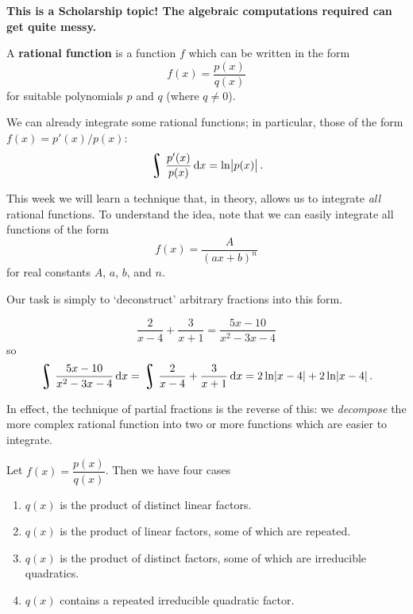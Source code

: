 


\textbf{\color{red} This is a Scholarship topic! The algebraic computations required can get quite messy.}

\begin{defn}
  A \textbf{rational function} is a function $ f $ which can be written in the form
  \begin{displaymath}
    f(x) = \dfrac{p(x)}{q(x)}
  \end{displaymath}
  for suitable polynomials $ p $ and $ q $ (where $ q \neq 0 $).
\end{defn}

We can already integrate some rational functions; in particular, those of the form $ f(x) = p'(x)/p(x) $:
\begin{displaymath}
  \rint \dfrac{p'(x)}{p(x)} \dif{x} = \ln\abs{p(x)}.
\end{displaymath}

This week we will learn a technique that, in theory, allows us to integrate \textit{all} rational functions. To understand
the idea, note that we can easily integrate all functions of the form
\begin{displaymath}
  f(x) = \dfrac{A}{(ax + b)^n}
\end{displaymath}
for real constants $ A $, $ a $, $ b $, and $ n $.

Our task is simply to `deconstruct' arbitrary fractions into this form.
\begin{ex}
  \begin{displaymath}
    \dfrac{2}{x-4} + \dfrac{3}{x + 1} = \dfrac{5x - 10}{x^2 - 3x - 4}
  \end{displaymath}
  so
  \begin{displaymath}
    \rint \dfrac{5x - 10}{x^2 - 3x - 4} \dif{x} = \rint \dfrac{2}{x-4} + \dfrac{3}{x + 1} \dif{x} = 2\ln\abs{x-4} + 2\ln\abs{x-4}.
  \end{displaymath}
\end{ex}

In effect, the technique of partial fractions is the reverse of this: we \emph{decompose} the more
complex rational function into two or more functions which are easier to integrate.

Let $ f(x) = \dfrac{p(x)}{q(x)} $. Then we have four cases
\begin{enumerate}
  \item $ q(x) $ is the product of distinct linear factors.
  \item $ q(x) $ is the product of linear factors, some of which are repeated.
  \item $ q(x) $ is the product of distinct factors, some of which are irreducible quadratics.
  \item $ q(x) $ contains a repeated irreducible quadratic factor.
\end{enumerate}

